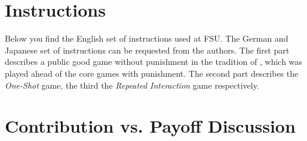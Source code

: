 \documentclass[11pt,a4paper]{article}
\begin{document}
\begin{refsection}
\section{Instructions}

Below you find the English set of instructions used at FSU. The German and Japanese set of instructions can be requested from the authors.
The first part describes a public good game without punishment in the tradition of \citep{Fischbacher2001}, which was played ahead of the core games with punishment. The second part describes the \emph{One-Shot} game, the third the \emph{Repeated Interaction} game respectively.


%
%
%
%


\section{Contribution vs. Payoff Discussion}\label{ap:sec:con1pay}


\end{refsection}
\end{document}
